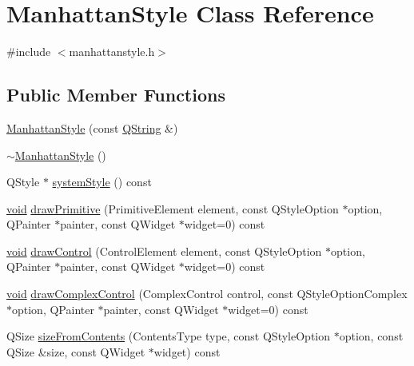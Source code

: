 \hypertarget{class_manhattan_style}{\section{\-Manhattan\-Style \-Class \-Reference}
\label{class_manhattan_style}
}


{\ttfamily \#include $<$manhattanstyle.\-h$>$}

\subsection*{\-Public \-Member \-Functions}
\begin{DoxyCompactItemize}
\item 
\hyperlink{group___core_plugin_ga4b21c0e4e089ae1e7393ef1349a47d36}{\-Manhattan\-Style} (const \hyperlink{group___u_a_v_objects_plugin_gab9d252f49c333c94a72f97ce3105a32d}{\-Q\-String} \&)
\item 
\hyperlink{group___core_plugin_ga6b9736a4e80d76843fcc68abaf59d38a}{$\sim$\-Manhattan\-Style} ()
\item 
\-Q\-Style $\ast$ \hyperlink{group___core_plugin_ga2ee8bb8626f313a1dc3b9c161d3e5321}{system\-Style} () const 
\item 
\hyperlink{group___u_a_v_objects_plugin_ga444cf2ff3f0ecbe028adce838d373f5c}{void} \hyperlink{group___core_plugin_ga05806a092b021a7b82a266b563ebe921}{draw\-Primitive} (\-Primitive\-Element element, const \-Q\-Style\-Option $\ast$option, \-Q\-Painter $\ast$painter, const \-Q\-Widget $\ast$widget=0) const 
\item 
\hyperlink{group___u_a_v_objects_plugin_ga444cf2ff3f0ecbe028adce838d373f5c}{void} \hyperlink{group___core_plugin_ga535d0da17b1de8f4aead3234031bc4e9}{draw\-Control} (\-Control\-Element element, const \-Q\-Style\-Option $\ast$option, \-Q\-Painter $\ast$painter, const \-Q\-Widget $\ast$widget=0) const 
\item 
\hyperlink{group___u_a_v_objects_plugin_ga444cf2ff3f0ecbe028adce838d373f5c}{void} \hyperlink{group___core_plugin_ga62de2c676daa999f53f69bff30ebbf4c}{draw\-Complex\-Control} (\-Complex\-Control control, const \-Q\-Style\-Option\-Complex $\ast$option, \-Q\-Painter $\ast$painter, const \-Q\-Widget $\ast$widget=0) const 
\item 
\-Q\-Size \hyperlink{group___core_plugin_gae73b65e8a877259659ebe19fd11969e6}{size\-From\-Contents} (\-Contents\-Type type, const \-Q\-Style\-Option $\ast$option, const \-Q\-Size \&size, const \-Q\-Widget $\ast$widget) const 
\item 

\end{DoxyCompactItemize}
